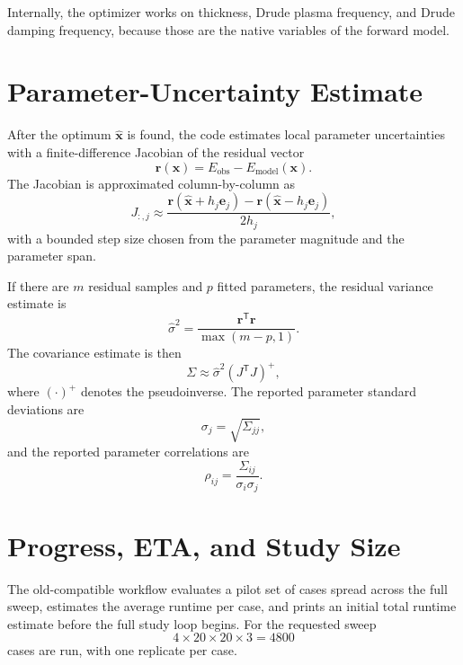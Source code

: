 \documentclass[11pt]{article}
\begin{document}
Internally, the optimizer works on thickness, Drude plasma frequency, and Drude damping
frequency, because those are the native variables of the forward model.

\section{Parameter-Uncertainty Estimate}
After the optimum \(\hat{\mathbf{x}}\) is found, the code estimates local parameter
uncertainties with a finite-difference Jacobian of the residual vector
\[
\mathbf{r}(\mathbf{x}) = E_{\mathrm{obs}} - E_{\mathrm{model}}(\mathbf{x}).
\]
The Jacobian is approximated column-by-column as
\[
J_{:,j}
\approx
\frac{\mathbf{r}(\hat{\mathbf{x}} + h_j \mathbf{e}_j)
-
\mathbf{r}(\hat{\mathbf{x}} - h_j \mathbf{e}_j)}
{2h_j},
\]
with a bounded step size chosen from the parameter magnitude and the parameter span.

If there are \(m\) residual samples and \(p\) fitted parameters, the residual variance estimate is
\[
\hat{\sigma}^2 = \frac{\mathbf{r}^\mathsf{T}\mathbf{r}}{\max(m-p,1)}.
\]
The covariance estimate is then
\[
\Sigma \approx \hat{\sigma}^2 (J^\mathsf{T}J)^+,
\]
where \((\cdot)^+\) denotes the pseudoinverse. The reported parameter standard deviations are
\[
\sigma_j = \sqrt{\Sigma_{jj}},
\]
and the reported parameter correlations are
\[
\rho_{ij} = \frac{\Sigma_{ij}}{\sigma_i \sigma_j}.
\]

\section{Progress, ETA, and Study Size}
The old-compatible workflow evaluates a pilot set of cases spread across the full sweep,
estimates the average runtime per case, and prints an initial total runtime estimate before the
full study loop begins. For the requested sweep
\[
4 \times 20 \times 20 \times 3 = 4800
\]
cases are run, with one replicate per case.
\end{document}
